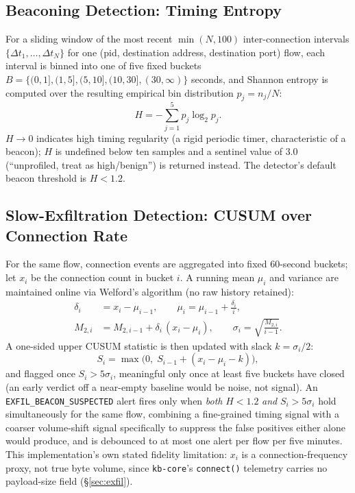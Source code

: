 \documentclass{article}
\newcounter{algo}
\begin{document}
\subsection{Beaconing Detection: Timing Entropy}
\label{sec:math-entropy}

For a sliding window of the most recent $\min(N,100)$ inter-connection
intervals $\{\Delta t_1,\dots,\Delta t_N\}$ for one (pid, destination
address, destination port) flow, each interval is binned into one of
five fixed buckets $B = \{(0,1], (1,5], (5,10], (10,30], (30,\infty)\}$
seconds, and Shannon entropy \citep{shannon1948mathematical} is
computed over the resulting empirical bin distribution $p_j = n_j / N$:
\begin{equation}
  H = -\sum_{j=1}^{5} p_j \log_2 p_j.
  \label{eq:entropy}
\end{equation}
$H \to 0$ indicates high timing regularity (a rigid periodic timer,
characteristic of a beacon); $H$ is undefined below ten samples and a
sentinel value of $3.0$ (``unprofiled, treat as high/benign'') is
returned instead. The detector's default beacon threshold is
$H < 1.2$.

\subsection{Slow-Exfiltration Detection: CUSUM over Connection Rate}
\label{sec:math-cusum}

For the same flow, connection events are aggregated into fixed
60-second buckets; let $x_i$ be the connection count in bucket $i$. A
running mean $\mu_i$ and variance are maintained online via Welford's
algorithm (no raw history retained):
\begin{align}
  \delta_i &= x_i - \mu_{i-1}, \qquad
  \mu_i = \mu_{i-1} + \frac{\delta_i}{i}, \\
  M_{2,i} &= M_{2,i-1} + \delta_i\,(x_i - \mu_i), \qquad
  \sigma_i = \sqrt{\frac{M_{2,i}}{i-1}}.
\end{align}
A one-sided upper CUSUM statistic \citep{page1954continuous} is then
updated with slack $k = \sigma_i / 2$:
\begin{equation}
  S_i = \max\!\big(0,\; S_{i-1} + (x_i - \mu_i - k)\big),
  \label{eq:cusum}
\end{equation}
and flagged once $S_i > 5\sigma_i$, meaningful only once at least five
buckets have closed (an early verdict off a near-empty baseline would
be noise, not signal). An \texttt{EXFIL\_BEACON\_SUSPECTED} alert fires
only when \emph{both} $H < 1.2$ \emph{and} $S_i > 5\sigma_i$ hold
simultaneously for the same flow, combining a fine-grained timing
signal with a coarser volume-shift signal specifically to suppress the
false positives either alone would produce, and is debounced to at
most one alert per flow per five minutes. This implementation's own
stated fidelity limitation: $x_i$ is a connection-frequency proxy, not
true byte volume, since \texttt{kb-core}'s \texttt{connect()} telemetry
carries no payload-size field (\S\ref{sec:exfil}).
\end{document}
